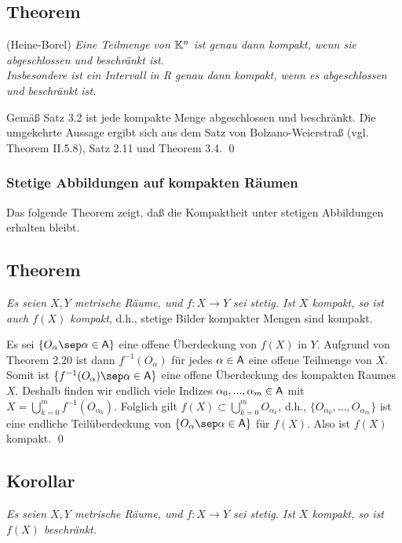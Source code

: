 \documentclass[a4paper,twoside]{book}
\begin{document}
\subsection{Theorem} (Heine-Borel) \textit{Eine Teilmenge von $\mathbb{K}^n$ ist genau dann kompakt,
wenn sie abgeschlossen und beschränkt ist.}\\

\textit{Insbesondere ist ein Intervall in R genau dann kompakt, wenn es abgeschlossen
und beschränkt ist.}

\begin{Beweis} Gemäß Satz 3.2 ist jede kompakte Menge abgeschlossen und beschränkt.
Die umgekehrte Aussage ergibt sich aus dem Satz von Bolzano-Weierstraß (vgl.
Theorem II.5.8), Satz 2.11 und Theorem 3.4. \qed
\end{Beweis}

\subsubsection{Stetige Abbildungen auf kompakten Räumen}

Das folgende Theorem zeigt, daß die Kompaktheit unter stetigen Abbildungen
erhalten bleibt.

\subsection{Theorem} \textit{Es seien $X, Y$ metrische Räume, und $f : X \rightarrow Y$ sei stetig. Ist $X$
kompakt, so ist auch $f(X)$ kompakt}, d.h., stetige Bilder kompakter Mengen sind
kompakt. \smallskip

\begin{Beweis} Es sei $\{O_\alpha \sep \alpha \in \A\}$ eine offene Überdeckung von $f(X)$ in $Y$. Aufgrund
von Theorem 2.20 ist dann $f^{-1}(O_\alpha)$ für jedes $\alpha \in \mathsf{A}$ eine offene Teilmenge von $X$.
Somit ist $\{ f^{-1}(O_\alpha) \sep \alpha \in \A\}$ 
eine offene Überdeckung des kompakten Raumes $X$.
Deshalb finden wir endlich viele Indizes $\alpha_0, . . . , \alpha_m \in \mathsf{A}$ mit $X = \bigcup^m_{k=0} f^{-1}(O_{\alpha_k} )$.
Folglich gilt $f(X) \subset \bigcup^m_{k=0} O_{\alpha_k}$, 
d.h., $\{O_{\alpha_0}, . . .,O_{\alpha_m}\}$ ist eine endliche Teilüberdeckung
von $\{O_\alpha \sep \alpha \in \A\}$ für $f(X)$. Also ist $f(X)$ kompakt. \qed
\end{Beweis}\smallskip

\subsection{Korollar} \textit{Es seien $X, Y$ metrische Räume, und $f : X \rightarrow Y$ sei stetig. Ist $X$
kompakt, so ist $f(X)$ beschränkt.}\smallskip
\end{document}
